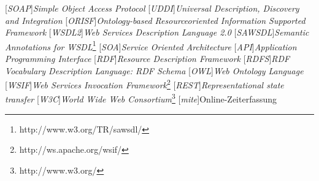 
[\emph{SOAP}]{\emph{Simple Object Access Protocol}}
[\emph{UDDI}]{\emph{Universal Description, Discovery and Integration}}
[\emph{ORISF}]{\emph{Ontology-based Resourceoriented Information Supported Framework}}
[\emph{WSDL2}]{\emph{Web Services Description Language 2.0}}
[\emph{SAWSDL}]{\emph{Semantic Annotations for WSDL}\footnote{http://www.w3.org/TR/sawsdl/}}
[\emph{SOA}]{\emph{Service Oriented Architecture}}
[\emph{API}]{\emph{Application Programming Interface}}
[\emph{RDF}]{\emph{Resource Description Framework}}
[\emph{RDFS}]{\emph{RDF Vocabulary Description Language: RDF Schema}}
[\emph{OWL}]{\emph{Web Ontology Language}}
[\emph{WSIF}]{\emph{Web Services Invocation Framework}\footnote{http://ws.apache.org/wsif/}}
[\emph{REST}]{\emph{Representational state transfer}}
[\emph{W3C}]{\emph{World Wide Web Consortium}\footnote{http://www.w3.org/}}
[\emph{mite}]{Online-Zeiterfassung}